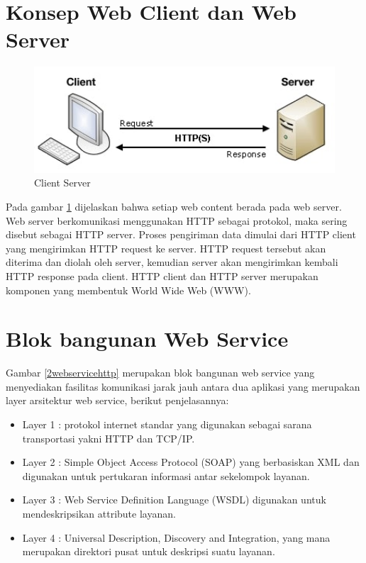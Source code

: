 \section{Konsep Web Client dan Web Server}

\begin{figure}[ht]
\centerline{\includegraphics[width=1\textwidth]{figures/2http.jpg}}
\caption{Client Server}
\label{2http}
\end{figure}

Pada gambar \ref{2http} dijelaskan bahwa setiap web content berada pada web server. Web server berkomunikasi menggunakan HTTP sebagai protokol, maka sering disebut sebagai HTTP server. Proses pengiriman data dimulai dari HTTP client yang mengirimkan HTTP request ke server. HTTP request tersebut akan diterima dan diolah oleh server, kemudian server akan mengirimkan kembali HTTP response pada client. HTTP client dan HTTP server merupakan komponen yang membentuk World Wide Web (WWW).

\section{Blok bangunan Web Service}

Gambar \ref{2webservicehttp} merupakan blok bangunan web service yang menyediakan fasilitas komunikasi jarak jauh antara dua aplikasi yang merupakan layer arsitektur web service, berikut penjelasannya:
\begin{itemize}
\item Layer 1 : protokol internet standar yang digunakan sebagai sarana transportasi yakni HTTP dan TCP/IP.
\item Layer 2 : Simple Object Access Protocol (SOAP) yang berbasiskan XML dan digunakan untuk pertukaran informasi antar sekelompok layanan.
\item Layer 3 : Web Service Definition Language (WSDL) digunakan untuk mendeskripsikan attribute layanan.
\item Layer 4 : Universal Description, Discovery and Integration, yang mana merupakan direktori pusat untuk deskripsi suatu layanan\cite{deviana2013penerapan}.
\end{itemize}

